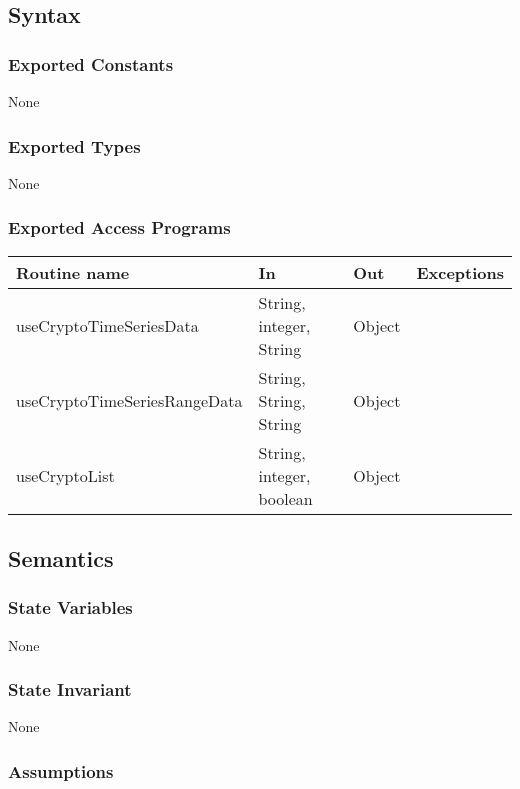 \documentclass[12pt]{article}
\begin{document}
\subsection{Syntax}

\subsubsection{Exported Constants}

None

\subsubsection{Exported Types}

None

\subsubsection{Exported Access Programs}

\begin{tabular}{| l | l | l | p{5cm} |}
\hline
\textbf{Routine name} & \textbf{In} & \textbf{Out} & \textbf{Exceptions}\\
\hline
useCryptoTimeSeriesData & String, integer, String & Object & \\
\hline
useCryptoTimeSeriesRangeData & String, String, String & Object & \\
\hline
useCryptoList & String, integer, boolean & Object & \\
\hline

\end{tabular}

\subsection{Semantics}

\subsubsection{State Variables}

None

\subsubsection{State Invariant}

None

\subsubsection{Assumptions}
\end{document}
